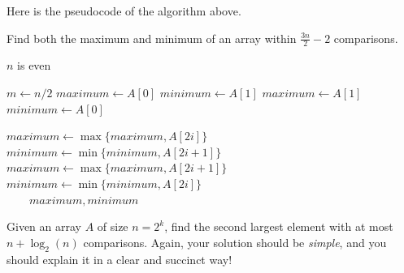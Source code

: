 Here is the pseudocode of the algorithm above.
\begin{algorithm}
    \caption{Find both the maximum and minimum of an array within $\frac{3n}{2} - 2$ comparisons.}
    \begin{algorithmic}
        \Ensure $n$ is even
        
        \State $m \gets n / 2$
            \State $maximum \gets A[0]$
            \State $minimum \gets A[1]$
        \Else
            \State $maximum \gets A[1]$
            \State $minimum \gets A[0]$
        \EndIf
        
                \State $maximum \gets \max\{maximum, A[2i]\}$
                \State $minimum \gets \min\{minimum, A[2i + 1]\}$
            \Else
                \State $maximum \gets \max\{maximum, A[2i + 1]\}$
                \State $minimum \gets \min\{minimum, A[2i]\}$
            \EndIf
        \EndFor
        \\\ \ \ \ \Return $maximum, minimum$
        \EndFunction
    \end{algorithmic}
\end{algorithm}

\newpage

\begin{thm}{}{}
    Given an array $A$ of size $n = 2^k$, find the second largest element with at most $n + \log_2(n)$ comparisons. Again, your solution should be \textit{simple}, and you should explain it in a clear and succinct way!
\end{thm}

